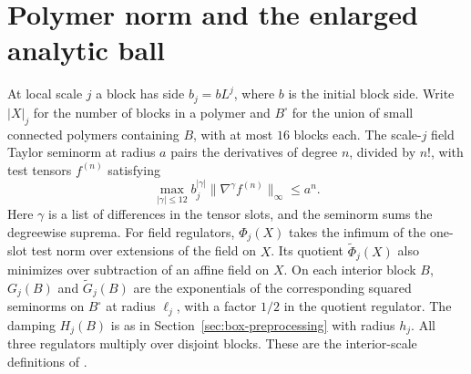 \documentclass[11pt]{article}
\begin{document}
\section{Polymer norm and the enlarged analytic ball}\label{sec:contraction}
At local scale \(j\) a block has side \(b_j=bL^j\), where
\(b\) is the initial block side. Write \(|X|_j\) for the
number of blocks in a polymer and \(B^\square\) for the union of
small connected polymers containing \(B\), with at most \(16\)
blocks each. The scale-\(j\) field Taylor seminorm at radius
\(a\) pairs the derivatives of degree \(n\), divided by \(n!\),
with test tensors \(f^{(n)}\) satisfying
\[
 \max_{|\gamma|\le12}b_j^{|\gamma|}
      \|\nabla^\gamma f^{(n)}\|_\infty\le a^n.
\]
Here \(\gamma\) is a list of differences in the tensor slots,
and the seminorm sums the degreewise suprema. For field
regulators, \(\Phi_j(X)\) takes the infimum of the one-slot
test norm over extensions of the field on \(X\).
Its quotient \(\widetilde\Phi_j(X)\) also minimizes over
subtraction of an affine field on \(X\). On each interior block
\(B\), \(G_j(B)\) and \(\widetilde G_j(B)\) are the exponentials of
the corresponding squared seminorms on \(B^\square\) at radius
\(\ell_j\), with a factor \(1/2\) in the quotient regulator.
The damping \(H_j(B)\) is as in Section~\ref{sec:box-preprocessing}
with radius \(h_j\). All three regulators multiply over disjoint
blocks. These are the interior-scale definitions of
\cite[Sections 2.2--2.6]{ParkMap}.
\end{document}
